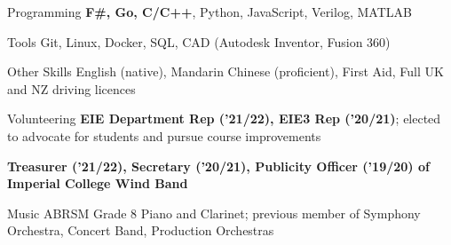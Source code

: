 

\begin{cvskills}


  \cvskill
    {Programming} %
    {\textbf{F\#, Go, C/C++}, Python, JavaScript, Verilog, MATLAB} %

  \cvskill
    {Tools} %
    {Git, Linux, Docker, SQL, CAD (Autodesk Inventor, Fusion 360)} %

  \cvskill
    {Other Skills}
    {English (native), Mandarin Chinese (proficient), First Aid, Full UK and NZ driving licences}

  \cvskill
    {Volunteering} %
    {\textbf{EIE Department Rep ('21/22), EIE3 Rep ('20/21)}; elected to advocate for students and pursue course improvements} %

  \cvskill
    {} %
    {\textbf{Treasurer ('21/22), Secretary ('20/21), Publicity Officer ('19/20) of Imperial College Wind Band}} %



  \cvskill
    {Music} %
    {ABRSM Grade 8 Piano and Clarinet; previous member of Symphony Orchestra, Concert Band, Production Orchestras} %


\end{cvskills}
